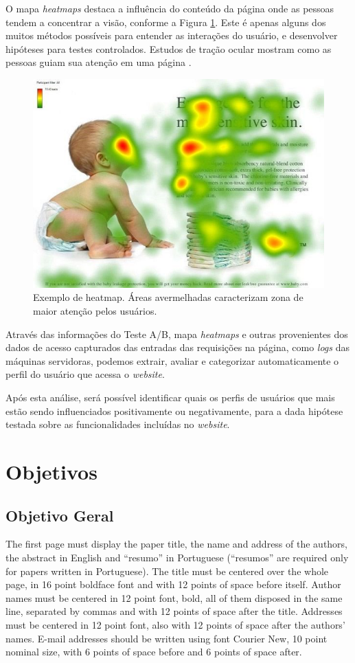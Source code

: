 \documentclass[12pt]{article}
\begin{document}
O mapa \textit{heatmaps} destaca a influência do conteúdo da página onde as pessoas tendem a concentrar a visão, conforme a Figura \ref{fig:heatmap1}. Este é apenas alguns dos muitos métodos possíveis para entender as interações do usuário, e desenvolver hipóteses para testes controlados. Estudos de tração ocular mostram como as pessoas guiam sua atenção em uma página \cite{goward:13}.

\begin{figure}[ht]
\centering
\includegraphics[width=.8\textwidth]{fig1.jpg}
\caption{Exemplo de heatmap. Áreas avermelhadas caracterizam zona de maior atenção pelos usuários. }
\label{fig:heatmap1}
\end{figure}

Através das informações do Teste A/B, mapa \textit{heatmaps} e outras provenientes dos dados de acesso capturados das entradas das requisições na página, como \textit{logs} das máquinas servidoras, podemos extrair, avaliar e categorizar automaticamente o perfil do usuário que acessa o \textit{website}.

Após esta análise, será possível identificar quais os perfis de usuários que mais estão sendo influenciados positivamente ou negativamente, para a dada hipótese testada sobre as funcionalidades incluídas no \textit{website}.

\section{Objetivos}
\subsection{Objetivo Geral}
The first page must display the paper title, the name and address of the
authors, the abstract in English and ``resumo'' in Portuguese (``resumos'' are
required only for papers written in Portuguese). The title must be centered
over the whole page, in 16 point boldface font and with 12 points of space
before itself. Author names must be centered in 12 point font, bold, all of
them disposed in the same line, separated by commas and with 12 points of
space after the title. Addresses must be centered in 12 point font, also with
12 points of space after the authors' names. E-mail addresses should be
written using font Courier New, 10 point nominal size, with 6 points of space
before and 6 points of space after.
\end{document}
